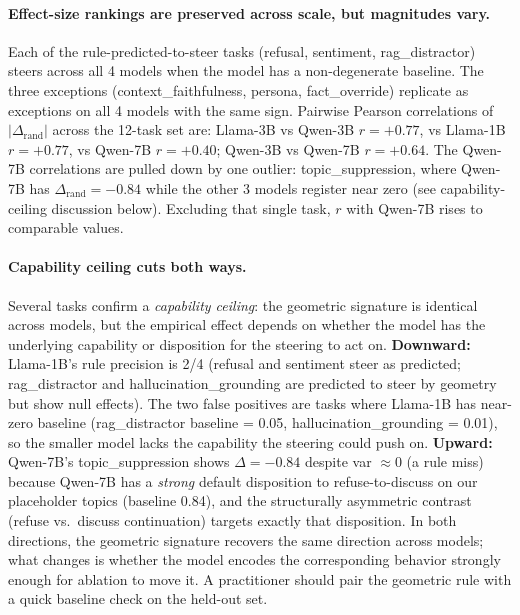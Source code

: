 \documentclass{article}
\begin{document}
\paragraph{Effect-size rankings are preserved across scale, but
magnitudes vary.}
Each of the rule-predicted-to-steer tasks (refusal, sentiment,
rag\_distractor) steers across all 4 models when the model has a
non-degenerate baseline. The three exceptions (context\_faithfulness,
persona, fact\_override) replicate as exceptions on all 4 models
with the same sign. Pairwise Pearson correlations of
$|\Delta_{\text{rand}}|$ across the 12-task set are: Llama-3B vs
Qwen-3B $r = +0.77$, vs Llama-1B $r = +0.77$, vs Qwen-7B $r = +0.40$;
Qwen-3B vs Qwen-7B $r = +0.64$. The Qwen-7B correlations are pulled
down by one outlier: topic\_suppression, where Qwen-7B has
$\Delta_{\text{rand}} = -0.84$ while the other 3 models register
near zero (see capability-ceiling discussion below). Excluding
that single task, $r$ with Qwen-7B rises to comparable values.

\paragraph{Capability ceiling cuts both ways.}
Several tasks confirm a \emph{capability ceiling}: the geometric
signature is identical across models, but the empirical effect
depends on whether the model has the underlying capability or
disposition for the steering to act on.
\textbf{Downward:} Llama-1B's rule precision is 2/4 (refusal and
sentiment steer as predicted; rag\_distractor and
hallucination\_grounding are predicted to steer by geometry but
show null effects). The two false positives are tasks where
Llama-1B has near-zero baseline (rag\_distractor baseline = 0.05,
hallucination\_grounding = 0.01), so the smaller model lacks the
capability the steering could push on.
\textbf{Upward:} Qwen-7B's topic\_suppression shows $\Delta = -0.84$
despite var $\approx 0$ (a rule miss) because Qwen-7B has a
\emph{strong} default disposition to refuse-to-discuss on our
placeholder topics (baseline 0.84), and the structurally asymmetric
contrast (refuse vs.~discuss continuation) targets exactly that
disposition. In both directions, the geometric signature recovers
the same direction across models; what changes is whether the
model encodes the corresponding behavior strongly enough for
ablation to move it. A practitioner should pair the geometric
rule with a quick baseline check on the held-out set.

\end{document}
